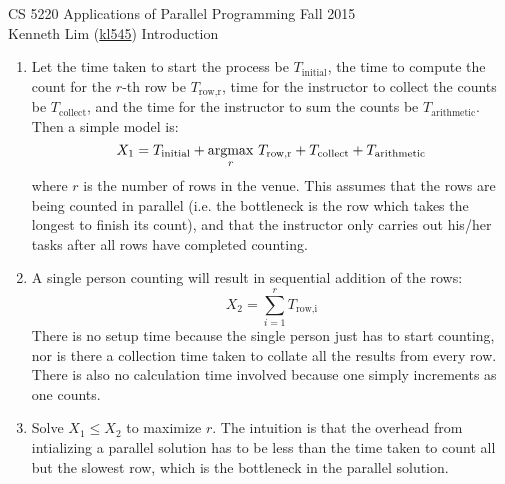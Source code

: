 \documentclass{scrartcl}
\newcommand{\argmax}{\operatornamewithlimits{argmax}}
\begin{document}
  \begin{framed}
  \large
  CS 5220 Applications of Parallel Programming \hfill Fall 2015 \\
  Kenneth Lim (\href{mailto:kl545@cornell.edu}{kl545}) \hfill Introduction \hspace{-3ex}
  \end{framed}
  \begin{enumerate}
    \item Let the time taken to start the process be $T_\textrm{initial}$, the time to compute the count for the $r$-th row be $T_\textrm{row,r}$, time for the instructor to collect the counts be $T_\textrm{collect}$, and the time for the instructor to sum the counts be $T_\textrm{arithmetic}$. Then a simple model is:
    \[
      X_1 = T_\textrm{initial} + \argmax_r\,T_\textrm{row,r} + T_\textrm{collect} + T_\textrm{arithmetic}
    \]
    where $r$ is the number of rows in the venue. This assumes that the rows are being counted in parallel (i.e. the bottleneck is the row which takes the longest to finish its count), and that the instructor only carries out his/her tasks after all rows have completed counting.
    \item A single person counting will result in sequential addition of the rows:
    \[
      X_2 = \sum_{i=1}^r T_\textrm{row,i}
    \]
    There is no setup time because the single person just has to start counting, nor is there a collection time taken to collate all the results from every row. There is also no calculation time involved because one simply increments as one counts.
    \item Solve $X_1 \leq X_2$ to maximize $r$. The intuition is that the overhead from intializing a parallel solution has to be less than the time taken to count all but the slowest row, which is the bottleneck in the parallel solution.
  \end{enumerate}
\end{document}
